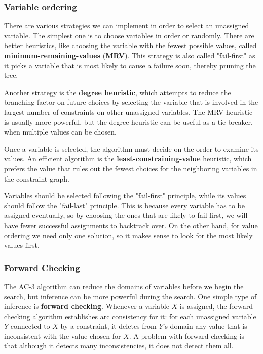 \documentclass{article}
\begin{document}
\subsubsection{Variable ordering}
There are various strategies we can implement in order to select an unassigned variable. The simplest one is to choose variables in order or randomly. There are better heuristics, like choosing the variable with the fewest possible values, called \textbf{minimum-remaining-values} (\textbf{MRV}). This strategy is also called "fail-first" as it picks a variable that is most likely to cause a failure soon, thereby pruning the tree.

Another strategy is the \textbf{degree heuristic}, which attempts to reduce the branching factor on future choices by selecting the variable that is involved in the largest number of constraints on other unassigned variables. The MRV heuristic is usually more powerful, but the degree heuristic can be useful as a tie-breaker, when multiple values can be chosen.

Once a variable is selected, the algorithm must decide on the order to examine its values. An efficient algorithm is the \textbf{least-constraining-value} heuristic, which prefers the value that rules out the fewest choices for the neighboring variables in the constraint graph.

Variables should be selected following the "fail-first" principle, while its values should follow the "fail-last" principle. This is because every variable has to be assigned eventually, so by choosing the ones that are likely to fail first, we will have fewer successful assignments to backtrack over. On the other hand, for value ordering we need only one solution, so it makes sense to look for the most likely values first.

\subsubsection{Forward Checking}
The AC-3 algorithm can reduce the domains of variables before we begin the search, but inference can be more powerful during the search. One simple type of inference is \textbf{forward checking}. Whenever a variable $X$ is assigned, the forward checking algorithm establishes arc consistency for it: for each unassigned variable $Y$ connected to $X$ by a constraint, it deletes from $Y$'s domain any value that is inconsistent with the value chosen for $X$. A problem with forward checking is that although it detects many inconsistencies, it does not detect them all.
\end{document}

